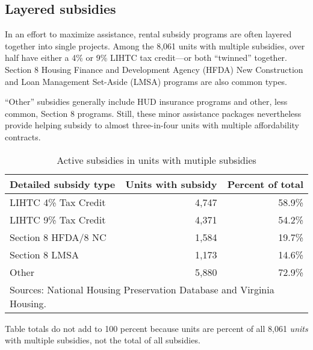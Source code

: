 \documentclass[
  letterpaper,
  DIV=11,
  numbers=noendperiod]{scrreprt}
\begin{document}
\hypertarget{layered-subsidies}{%
\subsection{Layered subsidies}\label{layered-subsidies}}

In an effort to maximize assistance, rental subsidy programs are often
layered together into single projects. Among the 8,061 units with
multiple subsidies, over half have either a 4\% or 9\% LIHTC tax
credit---or both ``twinned'' together. Section 8 Housing Finance and
Development Agency (HFDA) New Construction and Loan Management Set-Aside
(LMSA) programs are also common types.

``Other'' subsidies generally include HUD insurance programs and other,
less common, Section 8 programs. Still, these minor assistance packages
nevertheless provide helping subsidy to almost three-in-four units with
multiple affordability contracts.

\hypertarget{tbl-multiple}{}
\begin{table}
\caption{\label{tbl-multiple}Active subsidies in units with mutiple subsidies }\tabularnewline

\centering
\begin{tabular}{l|r|r}
\hline
Detailed subsidy type & Units with subsidy & Percent of total\\
\hline
LIHTC 4\% Tax Credit & 4,747 & 58.9\%\\
\hline
LIHTC 9\% Tax Credit & 4,371 & 54.2\%\\
\hline
Section 8 HFDA/8 NC & 1,584 & 19.7\%\\
\hline
Section 8 LMSA & 1,173 & 14.6\%\\
\hline
Other & 5,880 & 72.9\%\\
\hline
\multicolumn{3}{l}{\rule{0pt}{1em}Sources: National Housing Preservation Database and Virginia Housing.}\\
\end{tabular}
\end{table}

\begin{tcolorbox}[enhanced jigsaw, colframe=quarto-callout-note-color-frame, arc=.35mm, bottomrule=.15mm, colbacktitle=quarto-callout-note-color!10!white, opacityback=0, left=2mm, rightrule=.15mm, title=\textcolor{quarto-callout-note-color}{\faInfo}\hspace{0.5em}{Note}, colback=white, coltitle=black, toptitle=1mm, leftrule=.75mm, titlerule=0mm, breakable, opacitybacktitle=0.6, toprule=.15mm, bottomtitle=1mm]

Table totals do not add to 100 percent because units are percent of all
8,061 \emph{units} with multiple subsidies, not the total of all
subsidies.

\end{tcolorbox}
\end{document}
